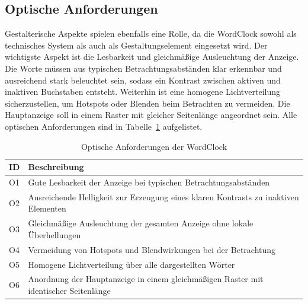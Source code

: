 \subsection{Optische Anforderungen}
Gestalterische Aspekte spielen ebenfalls eine Rolle, da die WordClock sowohl als technisches System als auch als Gestaltungselement eingesetzt wird.
Der wichtigste Aspekt ist die Lesbarkeit und gleichmäßige Ausleuchtung der Anzeige. 
Die Worte müssen aus typischen Betrachtungsabständen klar erkennbar und ausreichend stark beleuchtet sein, sodass ein Kontrast zwischen aktiven und inaktiven Buchstaben entsteht.
Weiterhin ist eine homogene Lichtverteilung sicherzustellen, um Hotspots oder Blenden beim Betrachten zu vermeiden.
Die Hauptanzeige soll in einem Raster mit gleicher Seitenlänge angeordnet sein.
Alle optischen Anforderungen sind in Tabelle~\ref{tab:Optische Anforderung} aufgelistet.

\begin{table}[H]
\caption{Optische Anforderungen der WordClock}
\centering
\begin{tabular}{p{0.5cm} p{15cm}}
\textbf{ID} & \textbf{Beschreibung} \\
\hline
O1 & Gute Lesbarkeit der Anzeige bei typischen Betrachtungsabständen \\
O2 & Ausreichende Helligkeit zur Erzeugung eines klaren Kontrasts zu inaktiven Elementen \\
O3 & Gleichmäßige Ausleuchtung der gesamten Anzeige ohne lokale Überhellungen \\
O4 & Vermeidung von Hotspots und Blendwirkungen bei der Betrachtung \\
O5 & Homogene Lichtverteilung über alle dargestellten Wörter \\
O6 & Anordnung der Hauptanzeige in einem gleichmäßigen Raster mit identischer Seitenlänge \\
\end{tabular}
\label{tab:Optische Anforderung}
\end{table}